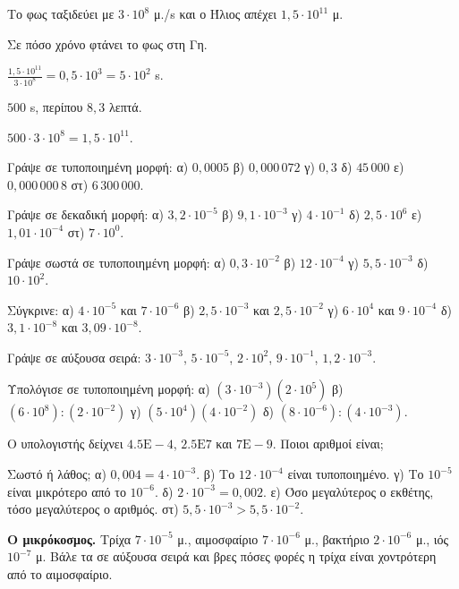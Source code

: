 \tixero Το φως ταξιδεύει με $3\cdot10^{8}$ μ./s και ο Ήλιος απέχει $1{,}5\cdot10^{11}$ μ.\par
\tithelo Σε πόσο χρόνο φτάνει το φως στη Γη.\par
\possindeo $\frac{1{,}5\cdot10^{11}}{3\cdot10^{8}}=0{,}5\cdot10^{3}=5\cdot10^{2}$ s.\par
\apantisi $500$ s, περίπου $8{,}3$ λεπτά.\par
\elegxos $500\cdot3\cdot10^8=1{,}5\cdot10^{11}$.



\ex Γράψε σε τυποποιημένη μορφή: α) $0{,}0005$ \quad β) $0{,}000\,072$ \quad γ) $0{,}3$ \quad δ) $45\,000$ \quad ε) $0{,}000\,000\,8$ \quad στ) $6\,300\,000$.

\ex Γράψε σε δεκαδική μορφή: α) $3{,}2\cdot10^{-5}$ \quad β) $9{,}1\cdot10^{-3}$ \quad γ) $4\cdot10^{-1}$ \quad δ) $2{,}5\cdot10^{6}$ \quad ε) $1{,}01\cdot10^{-4}$ \quad στ) $7\cdot10^{0}$.

\ex Γράψε σωστά σε τυποποιημένη μορφή: α) $0{,}3\cdot10^{-2}$ \quad β) $12\cdot10^{-4}$ \quad γ) $5{,}5\cdot10^{-3}$ \quad δ) $10\cdot10^{2}$.

\ex Σύγκρινε: α) $4\cdot10^{-5}$ και $7\cdot10^{-6}$ \quad β) $2{,}5\cdot10^{-3}$ και $2{,}5\cdot10^{-2}$ \quad γ) $6\cdot10^{4}$ και $9\cdot10^{-4}$ \quad δ) $3{,}1\cdot10^{-8}$ και $3{,}09\cdot10^{-8}$.

\ex Γράψε σε αύξουσα σειρά: $3\cdot10^{-3}$, $5\cdot10^{-5}$, $2\cdot10^{2}$, $9\cdot10^{-1}$, $1{,}2\cdot10^{-3}$.

\ex Υπολόγισε σε τυποποιημένη μορφή: α) $(3\cdot10^{-3})(2\cdot10^{5})$ \quad β) $(6\cdot10^{8}):(2\cdot10^{-2})$ \quad γ) $(5\cdot10^{4})(4\cdot10^{-2})$ \quad δ) $(8\cdot10^{-6}):(4\cdot10^{-3})$.

\ex Ο υπολογιστής δείχνει $4.5\mathrm{E}{-}4$, $2.5\mathrm{E}7$ και $7\mathrm{E}{-}9$. Ποιοι αριθμοί είναι;

\ex Σωστό ή λάθος; α) $0{,}004=4\cdot10^{-3}$. \quad β) Το $12\cdot10^{-4}$ είναι τυποποιημένο. \quad γ) Το $10^{-5}$ είναι μικρότερο από το $10^{-6}$. \quad δ) $2\cdot10^{-3}=0{,}002$. \quad ε) Όσο μεγαλύτερος ο εκθέτης, τόσο μεγαλύτερος ο αριθμός. \quad στ) $5{,}5\cdot10^{-3}>5{,}5\cdot10^{-2}$.


\ex \textbf{Ο μικρόκοσμος.} Τρίχα $7\cdot10^{-5}$ μ., αιμοσφαίριο $7\cdot10^{-6}$ μ., βακτήριο $2\cdot10^{-6}$ μ., ιός $10^{-7}$ μ. Βάλε τα σε αύξουσα σειρά και βρες πόσες φορές η τρίχα είναι χοντρότερη από το αιμοσφαίριο.

